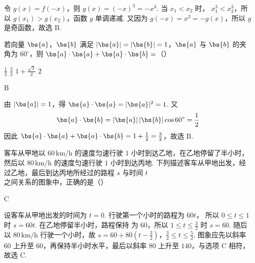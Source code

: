 \begin{solution}
令 \(g(x)=f(-x)\)，则 \(g(x)=(-x)^{3}=-x^{3}\). 当 \(x_{1}<x_{2}\) 时，
\(x_{1}^{3}<x_{2}^{3}\)，所以 \(g(x_{1})>g(x_{2})\)，函数 \(g\) 单调递减.
又因为 \(g(-x)=x^{3}=-g(x)\)，所以 \(g\) 是奇函数，故选 B.
\end{solution}

\begin{problem}
若向量 \(\bs{a}\)，\(\bs{b}\) 满足 \(|\bs{a}| = |\bs{b}| = 1\)，\(\bs{a}\) 与 \(\bs{b}\) 的夹角为 \(60^\circ\)，则 \(\bs{a} \cdot \bs{a} + \bs{a} \cdot \bs{b} =\)（\quad）

\choices
    {\(\frac{1}{2}\)}
    {\(\frac{3}{2}\)}
    {\(1 + \frac{\sqrt{3}}{2}\)}
    {\(2\)}
\end{problem}

\begin{answer}
B
\end{answer}

\begin{solution}
由 \(|\bs{a}|=1\)，得 \(\bs{a}\cdot\bs{a}=|\bs{a}|^{2}=1\). 又
\[
\bs{a}\cdot\bs{b}=|\bs{a}|\,|\bs{b}|\cos 60^\circ=\frac{1}{2}
\]
因此 \(\bs{a}\cdot\bs{a}+\bs{a}\cdot\bs{b}=1+\frac{1}{2}=\frac{3}{2}\)，故选 B.
\end{solution}

\begin{problem}
客车从甲地以 \(60\,\mathrm{km/h}\) 的速度匀速行驶 \(1\) 小时到达乙地，在乙地停留了半小时，然后以 \(80\,\mathrm{km/h}\) 的速度匀速行驶 \(1\) 小时到达丙地. 下列描述客车从甲地出发，经过乙地，最后到达丙地所经过的路程 \(s\) 与时间 \(t\) 之间关系的图象中，正确的是（\quad）

    {}
    {}
    {}
\end{problem}

\begin{answer}
C
\end{answer}

\begin{solution}
设客车从甲地出发的时间为 \(t=0\). 行驶第一个小时的路程为 \(60t\)，
所以 \(0\leqslant t\leqslant1\) 时 \(s=60t\). 在乙地停留半小时，路程保持
为 \(60\)，所以 \(1\leqslant t\leqslant\frac{3}{2}\) 时 \(s=60\). 随后以
\(80\,\mathrm{km/h}\) 行驶一个小时，故
\(s=60+80\left(t-\frac{3}{2}\right)\)，\(\frac{3}{2}\leqslant t\leqslant\frac{5}{2}\).
图象应先以斜率 \(60\) 上升至 \(60\)，再保持半小时水平，最后以斜率 \(80\) 上升至
\(140\)，与选项 C 相符，故选 C.
\end{solution}

